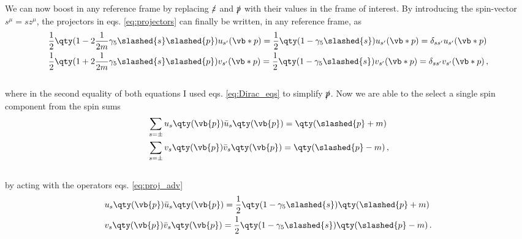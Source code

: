 \\
We can now boost in any reference frame by replacing $\slashed{z}$ and $\slashed{p}$ with their values in the frame of interest. By introducing the spin-vector $s^{\mu} = s z^{\mu}$, the projectors in eqs. \eqref{eq:projectors} can finally be written, in any reference frame, as
\\
\begin{equation}
    \begin{split}
        &\frac{1}{2} \qty(1 - 2 \frac{1}{2m}\gamma_5 \slashed{s} \slashed{p}) u_{s'}(\vb*{p}) = \frac{1}{2} \qty(1 - \gamma_5  \slashed{s}) u_{s'}(\vb*{p}) = \delta_{ss'}u_{s'}(\vb*{p})\\
        &\frac{1}{2} \qty(1 + 2 \frac{1}{2m}\gamma_5 \slashed{s} \slashed{p}) v_{s'}(\vb*{p}) = \frac{1}{2} \qty(1 - \gamma_5  \slashed{s}) v_{s'}(\vb*{p}) = \delta_{ss'}v_{s'}(\vb*{p}) \, ,
    \end{split}
    \label{eq:proj_adv}
\end{equation}
\\
where in the second equality of both equations I used eqs. \eqref{eq:Dirac_eqs} to simplify $\slashed{p}$. Now we are able to the select a single spin component from the spin sums 
\\
\begin{equation}
    \begin{split}
        &\sum_{s=\pm} u_{s} \qty(\vb{p}) \bar{u}_{s} \qty(\vb{p}) = \qty(\slashed{p} + m)\\
        &\sum_{s=\pm} v_{s} \qty(\vb{p}) \bar{v}_{s} \qty(\vb{p}) = \qty(\slashed{p} - m) \, ,
    \end{split}
\end{equation}
\\
by acting with the operators eqs. \eqref{eq:proj_adv}
\\
\begin{equation}
    \begin{split}
        &u_{s} \qty(\vb{p}) \bar{u}_{s} \qty(\vb{p}) = \frac{1}{2} \qty(1 - \gamma_5  \slashed{s}) \qty(\slashed{p} + m)\\
        &v_{s} \qty(\vb{p}) \bar{v}_{s} \qty(\vb{p}) = \frac{1}{2} \qty(1 - \gamma_5  \slashed{s}) \qty(\slashed{p} - m) \,.
    \end{split}
    \label{eq:spin:projectors}
\end{equation}

